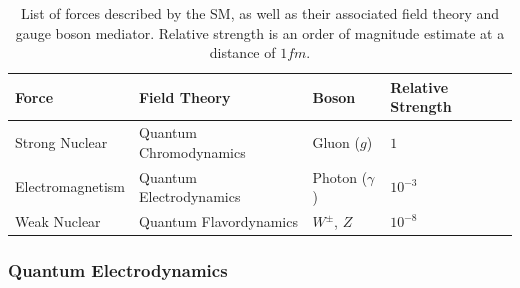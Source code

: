         \begin{table}[!ht]
            \begin{tabular}{l|l|l|l}
            Force & Field Theory & Boson & Relative Strength      \\ \hline
            Strong Nuclear   & Quantum Chromodynamics  & Gluon ($g$) & $1$ \\
            Electromagnetism & Quantum Electrodynamics & Photon ($\gamma$) & $10^{-3}$ \\
            Weak Nuclear     & Quantum Flavordynamics  & $W^{\pm}$, $Z$ & $10^{-8}$
            \end{tabular}
            \caption{List of forces described by the \gls{SM}, as well as their associated field theory and gauge boson mediator. Relative strength is an order of magnitude estimate at a distance of $\unit{1}{fm}$.}
            \label{tab:forces}
        \end{table}

        \subsubsection{Quantum Electrodynamics}

